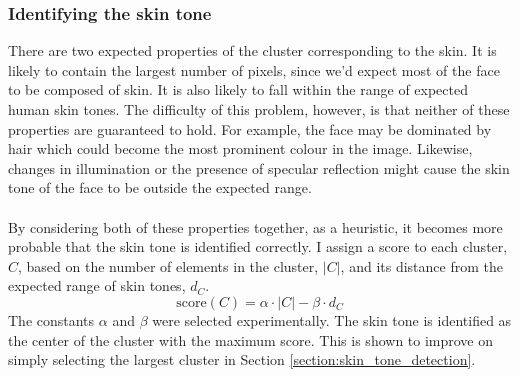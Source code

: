 \subsubsection{Identifying the skin tone}
There are two expected properties of the cluster corresponding to the skin. It is likely to contain the largest number of pixels, since we'd expect most of the face to be composed of skin. It is also likely to fall within the range of expected human skin tones.
The difficulty of this problem, however, is that neither of these properties are guaranteed to hold.
For example, the face may be dominated by hair which could become the most prominent colour in the image. Likewise, changes in illumination or the presence of specular reflection might cause the skin tone of the face to be outside the expected range.
\\ \\
By considering both of these properties together, as a heuristic, it becomes more probable that the skin tone is identified correctly. I assign a score to each cluster, $C$, based on the number of elements in the cluster, $|C|$, and its distance from the expected range of skin tones, $d_C$.
\begin{equation*}
    \mathrm{score}(C) = \alpha\cdot |C| - \beta\cdot d_C
\end{equation*}
The constants $\alpha$ and $\beta$ were selected experimentally. The skin tone is identified as the center of the cluster with the maximum score.
This is shown to improve on simply selecting the largest cluster in Section \ref{section:skin_tone_detection}.

